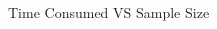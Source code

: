 \documentclass{beamer}
\begin{document}
\begin{CJK*}{UTF8}{gbsn}
\begin{frame}
\begin{minipage}{\linewidth}
\begin{minipage}{0.5\linewidth}
\begin{figure}[H]
\caption{Time Consumed VS Sample Size}
\end{figure}
\end{minipage}
\end{minipage}
\end{frame}


\end{CJK*}
\end{document}
